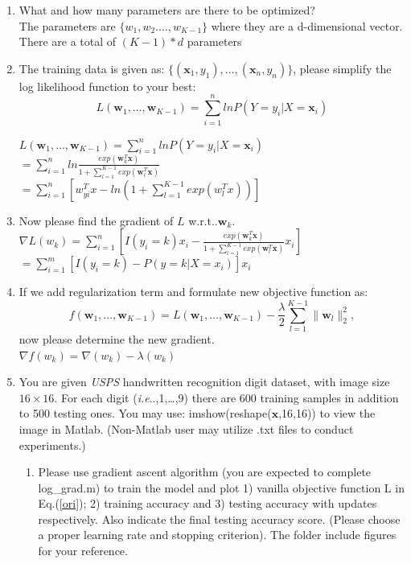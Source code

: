 \documentclass[11pt]{article}
\makeatletter
\newcommand{\vct}[1]{\mathbf{#1}}
\def \vw {\vct{w}}
\def \vx {\vct{x}}
\DeclareRobustCommand\onedot{\futurelet\@let@token\@onedot}
\def\@onedot{\ifx\@let@token.\else.\null\fi\xspace}
\def\ie{\emph{i.e}\onedot} \def\Ie{\emph{I.e}\onedot}
\def\wrt{w.r.t\onedot} \def\dof{d.o.f\onedot}
\makeatother
\begin{document}
\begin{enumerate}
	\item What and how many parameters are there to be optimized? \\
	The parameters are $\{w_1, w_2...., w_{K-1}\}$ where they are a d-dimensional vector. There are a total of $(K - 1) * d$ parameters

	\item The training data is given as: $\{(\vx_1,y_1),\dots,(\vx_n,y_n)\}$, please simplify the log likelihood function to your best:
	\begin{equation}\label{ori}
		L(\vw_1,\dots,\vw_{K-1})=\sum\limits_{i=1}^n ln P(Y=y_i|X=\vx_i)
	\end{equation}
	
	$L(\vw_1,\dots,\vw_{K-1})=\displaystyle\sum\limits_{i=1}^n ln P(Y=y_i|X=\vx_i)$\\
	$=\displaystyle\sum^n_{i=1} ln \frac{exp(\vw_k^T\vx)}{ 1+\displaystyle\sum\limits_{l=1}^{K-1}exp(\vw_l^T\vx)}$\\	
	$=\displaystyle\sum^n_{i=1} [w^T_{yi} x - ln(1 + \displaystyle\sum^{K - 1}_{l=1} exp(w^T_l x))]$
	\item Now please find the gradient of $L$ \wrt $\vw_k$.\\
	$\nabla L(w_k) =\displaystyle\sum^n_{i=1} [I(y_i = k) x_i - \frac{exp(\vw_k^T\vx)}{ 1+\displaystyle\sum\limits_{l=1}^{K-1}exp(\vw_l^T\vx)} x_i]$\\
	$=\displaystyle\sum^m_{i=1} [I(y_i = k) - P(y = k|X = x_i)]x_i$
	\item If we add regularization term and formulate new objective function as:
	\begin{equation}\label{reg}
		f(\vw_1,\dots,\vw_{K-1})=L(\vw_1,\dots,\vw_{K-1})-\frac{\lambda}{2}\sum\limits_{l=1}^{K-1}\|\vw_l\|^2_2,
	\end{equation}
	now please determine the new gradient.\\
	$\nabla f(w_k) = \nabla (w_k) - \lambda (w_k)$
	\item You are given \textit{USPS} handwritten recognition digit dataset, with image size $16 \times 16$. For each digit (\ie 0,1,\dots,9) there are 600 training samples in addition to 500 testing ones. You may use: imshow(reshape($\vx$,16,16)) to view the image in Matlab. (Non-Matlab user may utilize .txt files to conduct experiments.)
	\begin{enumerate}
		\item Please use gradient ascent algorithm (you are expected to complete log\_grad.m) to train the model and plot 1) vanilla objective function L in Eq.(\ref{ori}); 2) training accuracy and 3) testing accuracy with updates respectively. Also indicate the final testing accuracy score. (Please choose a proper learning rate and stopping criterion). The folder include figures for your reference. 

\end{enumerate}
\end{enumerate}
\end{document}
